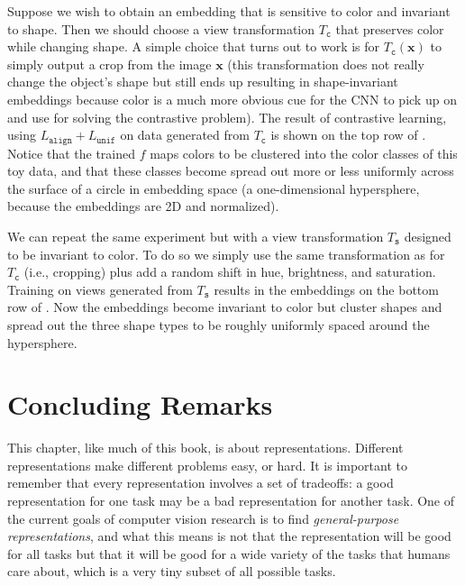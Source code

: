 Suppose we wish to obtain an embedding that is sensitive to color and invariant to shape. Then we should choose a view transformation $T_{\texttt{c}}$ that preserves color while changing shape. A simple choice that turns out to work is for $T_{\texttt{c}}(\mathbf{x})$ to simply output a crop from the image $\mathbf{x}$ (this transformation does not really change the object's shape but still ends up resulting in shape-invariant embeddings because color is a much more obvious cue for the CNN to pick up on and use for solving the contrastive problem). The result of contrastive learning, using $L_{\texttt{align}} + L_{\texttt{unif}}$ on data generated from $T_{\texttt{c}}$ is shown on the top row of \fig{\ref{fig:representation_learning:align_unif_results_shapes_dataset}}. Notice that the trained $f$ maps colors to be clustered into the color classes of this toy data, and that these classes become spread out more or less uniformly across the surface of a circle in embedding space (a one-dimensional hypersphere, because the embeddings are 2D and normalized).

We can repeat the same experiment but with a view transformation $T_{\texttt{s}}$ designed to be invariant to color. To do so we simply use the same transformation as for $T_{\texttt{c}}$ (i.e., cropping) plus add a random shift in hue, brightness, and saturation. Training on views generated from $T_{\texttt{s}}$ results in the embeddings on the bottom row of \fig{\ref{fig:representation_learning:align_unif_results_shapes_dataset}}. Now the embeddings become invariant to color but cluster shapes and spread out the three shape types to be roughly uniformly spaced around the hypersphere.


\section{Concluding Remarks}

This chapter, like much of this book, is about representations. Different representations make different problems easy, or hard. It is important to remember that every representation involves a set of tradeoffs: a good representation for one task may be a bad representation for another task. One of the current goals of computer vision research is to find \textit{general-purpose representations}, and what this means is not that the representation will be good for all tasks but that it will be good for a wide variety of the tasks that humans care about, which is a very tiny subset of all possible tasks.












